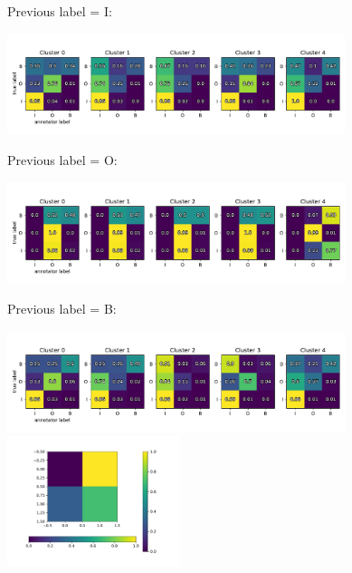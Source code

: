 \begin{figure}[h]
\begin{minipage}[b][0.5cm][b]{0.1\textwidth} 
Previous label = I:\\
\vspace{1cm}
\end{minipage}
  \includegraphics[width=0.88\textwidth, clip=True, trim=10 20 10 28]{figures/worker_models/seq_prev0_heatmap}
\vspace{0.2cm}
\\
\begin{minipage}[b][0.5cm][b]{0.1\textwidth} 
Previous label = O:\\
\vspace{1cm}
\end{minipage}
  \includegraphics[width=0.88\textwidth, clip=True, trim=10 20 10 50]{figures/worker_models/seq_prev1_heatmap}
\vspace{0.2cm}
\\
\begin{minipage}[b][0.5cm][b]{0.1\textwidth} 
Previous label = B:\\
\vspace{1cm}
\end{minipage}
  \includegraphics[width=0.88\textwidth, clip=True, trim=10 20 10 50]{figures/worker_models/seq_prev2_heatmap}
\\
\centering\includegraphics[width=0.45\textwidth,clip=True,trim=0 40 110 260]{figures/worker_models/colorbar}\\

\end{figure}

